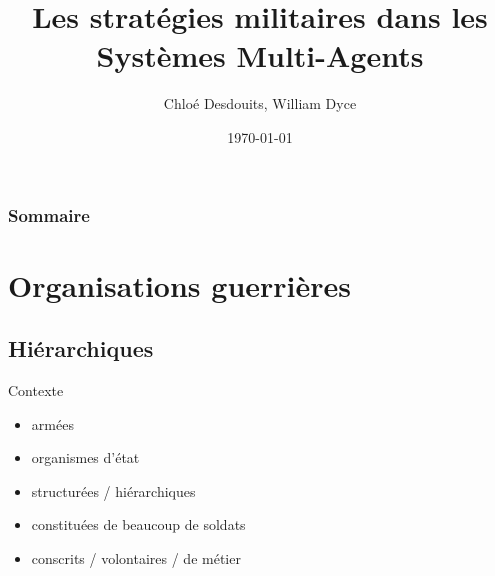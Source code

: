 \documentclass[utf8]{beamer}
\title{Les stratégies militaires dans les Systèmes Multi-Agents}
\author{Chloé Desdouits, William Dyce}
\date{\today}
\begin{document}
{
\frame[plain]{
	\titlepage
	}
}

{
\begin{frame}
	\frametitle{Sommaire}
	\tableofcontents
\end{frame} 
}



\section{Organisations guerrières}

\subsection{Hiérarchiques}

\begin{frame}{Contexte}
\begin{itemize}
\item armées
\item organismes d'état
\item structurées / hiérarchiques
\item constituées de beaucoup de soldats
\item conscrits / volontaires / de métier
\end{itemize}
\footlineextra{}
\end{frame}
\end{document}
